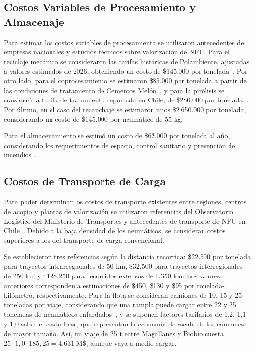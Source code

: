 \documentclass[letterpaper]{article}
\begin{document}
\subsection{Costos Variables de Procesamiento y Almacenaje}

Para estimar los costos variables de procesamiento se utilizaron antecedentes de empresas nacionales y estudios técnicos sobre valorización de NFU. Para el reciclaje mecánico se consideraron las tarifas históricas de Polambiente, ajustadas a valores estimados de 2026, obteniendo un costo de \$145.000 por tonelada~\cite{amphos2017,bases2024}. Por otro lado, para el coprocesamiento se estimaron \$85.000 por tonelada a partir de las condiciones de tratamiento de Cementos Melón~\cite{melon}, y para la pirólisis se consideró la tarifa de tratamiento reportada en Chile, de \$280.000 por tonelada~\cite{rivera2023}. Por último, en el caso del recauchaje se estimaron unos \$2.650.000 por tonelada, considerando un costo de \$145.000 por neumático de 55 kg.

Para el almacenamiento se estimó un costo de \$62.000 por tonelada al año, considerando los requerimientos de espacio, control sanitario y prevención de incendios~\cite{amphos2017}.

\subsection{Costos de Transporte de Carga}

Para poder determinar los costos de transporte existentes entre regiones, centros de acopio y plantas de valorización se utilizaron referencias del Observatorio Logístico del Ministerio de Transportes y antecedentes de transporte de NFU en Chile~\cite{steer2020,rivera2023}. Debido a la baja densidad de los neumáticos, se consideran costos superiores a los del transporte de carga convencional.

Se establecieron tres referencias según la distancia recorrida: \$22.500 por tonelada para trayectos intrarregionales de 50 km, \$32.500 para trayectos interregionales de 250 km y \$128.250 para recorridos extensos de 1.350 km. Los valores anteriores corresponden a estimaciones de \$450, \$130 y \$95 por tonelada-kilómetro, respectivamente. Para la flota se consideran camiones de 10, 15 y 25 toneladas por viaje, considerando que una rampla puede cargar entre 22 y 25 toneladas de neumáticos enfardados~\cite{amphos2017,rivera2023}, y se suponen factores tarifarios de 1,2, 1,1 y 1,0 sobre el costo base, que representan la economía de escala de los camiones de mayor tamaño. Así, un viaje de 25 t entre Magallanes y Biobío cuesta $25\cdot 1{,}0\cdot 185{,}25 = 4.631$ M\$, aunque vaya a medio cargar.
\end{document}
